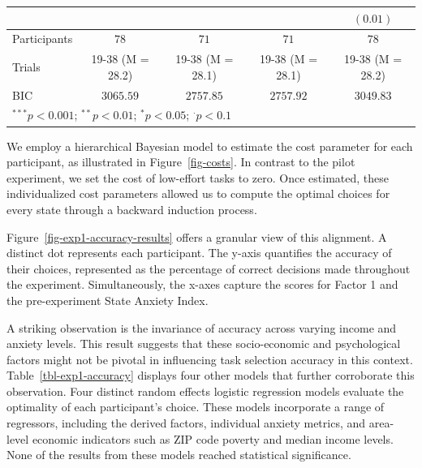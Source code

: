 \documentclass[
]{report}
\begin{document}
\begin{table}
\begin{minipage}[t]{\linewidth}
{\begin{center}
\begin{tabular}{l c c c c}
                       &                  &                  &                  & $(0.01)$         \\
\hline
Participants           & $78$             & $71$             & $71$             & $78$             \\
Trials                 & 19-38 (M = 28.2) & 19-38 (M = 28.1) & 19-38 (M = 28.1) & 19-38 (M = 28.2) \\
BIC                    & $3065.59$        & $2757.85$        & $2757.92$        & $3049.83$        \\
\hline
\multicolumn{5}{l}{\scriptsize{$^{***}p<0.001$; $^{**}p<0.01$; $^{*}p<0.05$; $^{\cdot}p<0.1$}}
\end{tabular}

\label{table:coefficients}
\end{center}

}

\end{minipage}%

\end{table}

We employ a hierarchical Bayesian model to estimate the cost parameter
for each participant, as illustrated in Figure~\ref{fig-costs}. In
contrast to the pilot experiment, we set the cost of low-effort tasks to
zero. Once estimated, these individualized cost parameters allowed us to
compute the optimal choices for every state through a backward induction
process.

Figure~\ref{fig-exp1-accuracy-results} offers a granular view of this
alignment. A distinct dot represents each participant. The y-axis
quantifies the accuracy of their choices, represented as the percentage
of correct decisions made throughout the experiment. Simultaneously, the
x-axes capture the scores for Factor 1 and the pre-experiment State
Anxiety Index.

A striking observation is the invariance of accuracy across varying
income and anxiety levels. This result suggests that these
socio-economic and psychological factors might not be pivotal in
influencing task selection accuracy in this context.
Table~\ref{tbl-exp1-accuracy} displays four other models that further
corroborate this observation. Four distinct random effects logistic
regression models evaluate the optimality of each participant's choice.
These models incorporate a range of regressors, including the derived
factors, individual anxiety metrics, and area-level economic indicators
such as ZIP code poverty and median income levels. None of the results
from these models reached statistical significance.
\end{document}
